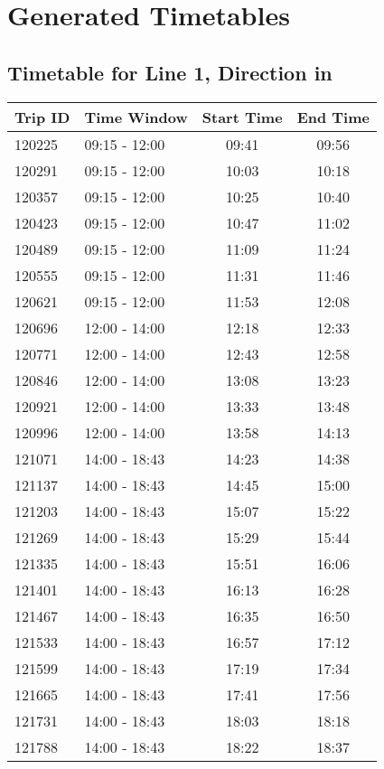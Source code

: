 \documentclass{article}
\begin{document}
            \section*{Generated Timetables}
            \subsection*{Timetable for Line 1, Direction in}
\begin{tabular}{llcc}
\toprule
Trip ID & Time Window & Start Time & End Time \\
\midrule
120225 & 09:15 - 12:00 & 09:41 & 09:56 \\
120291 & 09:15 - 12:00 & 10:03 & 10:18 \\
120357 & 09:15 - 12:00 & 10:25 & 10:40 \\
120423 & 09:15 - 12:00 & 10:47 & 11:02 \\
120489 & 09:15 - 12:00 & 11:09 & 11:24 \\
120555 & 09:15 - 12:00 & 11:31 & 11:46 \\
120621 & 09:15 - 12:00 & 11:53 & 12:08 \\
120696 & 12:00 - 14:00 & 12:18 & 12:33 \\
120771 & 12:00 - 14:00 & 12:43 & 12:58 \\
120846 & 12:00 - 14:00 & 13:08 & 13:23 \\
120921 & 12:00 - 14:00 & 13:33 & 13:48 \\
120996 & 12:00 - 14:00 & 13:58 & 14:13 \\
121071 & 14:00 - 18:43 & 14:23 & 14:38 \\
121137 & 14:00 - 18:43 & 14:45 & 15:00 \\
121203 & 14:00 - 18:43 & 15:07 & 15:22 \\
121269 & 14:00 - 18:43 & 15:29 & 15:44 \\
121335 & 14:00 - 18:43 & 15:51 & 16:06 \\
121401 & 14:00 - 18:43 & 16:13 & 16:28 \\
121467 & 14:00 - 18:43 & 16:35 & 16:50 \\
121533 & 14:00 - 18:43 & 16:57 & 17:12 \\
121599 & 14:00 - 18:43 & 17:19 & 17:34 \\
121665 & 14:00 - 18:43 & 17:41 & 17:56 \\
121731 & 14:00 - 18:43 & 18:03 & 18:18 \\
121788 & 14:00 - 18:43 & 18:22 & 18:37 \\
\bottomrule
\end{tabular}
\end{document}
